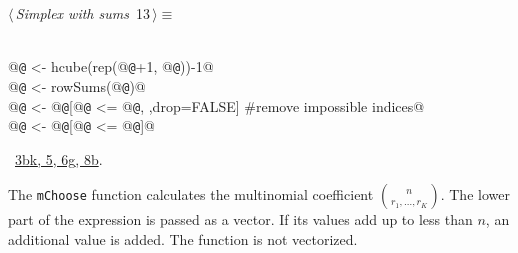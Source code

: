 \documentclass[reqno]{amsart}
\renewcommand{\NWtarget}[2]{\hypertarget{#1}{#2}}
\renewcommand{\NWlink}[2]{\hyperlink{#1}{#2}}
\begin{document}
\begin{flushleft} \small
\begin{minipage}{\linewidth}\label{scrap45}\raggedright\small
\NWtarget{nuweb13}{} $\langle\,${\itshape Simplex with sums}\nobreak\ {\footnotesize {13}}$\,\rangle\equiv$
\vspace{-1ex}
\begin{list}{}{} \item
\mbox{}\verb@@\\
\mbox{}\verb@   @{\tt @} <- hcube(rep(@{\tt @}+1, @{\tt @}))-1@\\
\mbox{}\verb@   @{\tt @} <- rowSums(@{\tt @})@\\
\mbox{}\verb@   @{\tt @} <- @{\tt @}[@{\tt @} <= @{\tt @}, ,drop=FALSE]  #remove impossible indices@\\
\mbox{}\verb@   @{\tt @} <- @{\tt @}[@{\tt @} <= @{\tt @}]@\\
\mbox{}\verb@@{\NWsep}
\end{list}
\vspace{-1.5ex}
\footnotesize
\begin{list}{}{\setlength{\itemsep}{-\parsep}\setlength{\itemindent}{-\leftmargin}}
\item \NWtxtMacroRefIn\ \NWlink{nuweb3b}{3b}\NWlink{nuweb3k}{k}\NWlink{nuweb5}{, 5}\NWlink{nuweb6g}{, 6g}\NWlink{nuweb8b}{, 8b}.

\item{}
\end{list}
\end{minipage}\vspace{4ex}
\end{flushleft}
The \texttt{mChoose} function calculates the multinomial coefficient $\binom{n}{r_1,\ldots,r_K}$. The lower
part of the expression is passed as a vector. If its values add up to less than $n$, an additional value
is added. The function is not vectorized.
\end{document}
